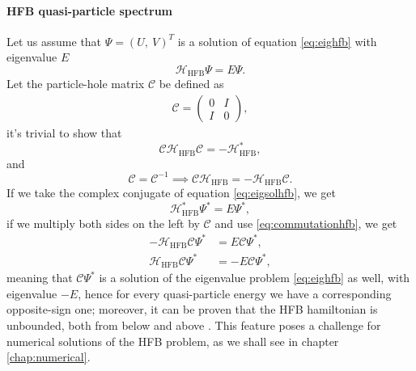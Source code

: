 \paragraph{HFB quasi-particle spectrum} Let us assume that $\Psi = (U,\  V )^T$ is a solution of equation \eqref{eq:eighfb} with eigenvalue $E$
\begin{equation}
    \label{eq:eigsolhfb}
    \mathcal H_\text{HFB}\Psi = E\Psi.
\end{equation}
Let the particle-hole matrix $\mathcal C$ be defined as
\begin{align}
    \mathcal C = \begin{pmatrix}
        0 & I \\ I&0
    \end{pmatrix},
\end{align}
it's trivial to show that 
\begin{equation}
    \label{eq:hfb_anticomm}
    \mathcal C \mathcal H_\text{HFB} \mathcal C = -\mathcal H_\text{HFB}^*,
\end{equation}
and 
\begin{equation}
    \label{eq:commutationhfb}
    \mathcal C = \mathcal C ^{-1}\implies \mathcal C\mathcal H_\text{HFB} = -\mathcal H_\text{HFB}\mathcal C.
\end{equation}
If we take the complex conjugate of equation \eqref{eq:eigsolhfb}, we get
\begin{equation}
    \label{eq:eigsolhfb_conj}
    \mathcal H_\text{HFB}^*\Psi ^* = E\Psi^*,
\end{equation}
if we multiply both sides on the left by $\mathcal C$ and use \eqref{eq:commutationhfb}, we get
\begin{align}
    -\mathcal H_\text{HFB}\mathcal C\Psi ^* &= E\mathcal C\Psi^*,\\
    \mathcal H_\text{HFB}\mathcal C\Psi ^* &= -E\mathcal C\Psi^*,
\end{align}
meaning that $\mathcal C \Psi^*$ is a solution of the eigenvalue problem \eqref{eq:eighfb} as well, with eigenvalue $-E$, hence for every quasi-particle energy we have a corresponding opposite-sign one; moreover, it can be proven that the HFB hamiltonian is unbounded, both from below and above \cite{Pei2012_HFBcontinuum}. This feature poses a challenge for numerical solutions of the HFB problem, as we shall see in chapter \ref{chap:numerical}.




